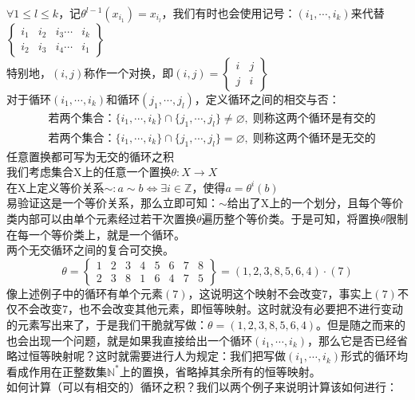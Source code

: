 $\forall 1\leq l\leq k$，记$\theta^{l-1}(x_{i_1})=x_{i_l}$，我们有时也会使用记号：$(i_1,\cdots,i_k)$来代替$
\left\{
\begin{array}{ccccc}
i_1&i_2&i_3\cdots &i_k\\
i_2&i_3&i_4\cdots &i_1
\end{array}
\right\}
$\\
特别地，$(i,j)$称作一个对换，即$(i,j)=
\left\{
\begin{array}{cc}
i&j\\
j&i
\end{array}
\right\}
$\\
对于循环$(i_1,\cdots,i_k)$和循环$(j_1,\cdots,j_l)$，定义循环之间的相交与否：
\[
\begin{aligned}
&\text{若两个集合：}\{i_1,\cdots,i_k\}\cap\{j_1,\cdots,j_l\}\neq \varnothing,\;\text{则称这两个循环是有交的}\\
&\text{若两个集合：}\{i_1,\cdots,i_k\}\cap\{j_1,\cdots,j_l\}= \varnothing,\;\text{则称这两个循环是无交的}
\end{aligned}
\]
任意置换都可写为无交的循环之积\\
我们考虑集合X上的任意一个置换$\theta \colon X\to X$\\
在X上定义等价关系$\sim\colon a\sim b\iff \exists i\in \mathbb{Z}$，使得$a=\theta^i(b)$\\
易验证这是一个等价关系，那么立即可知：$\sim$给出了X上的一个划分，且每个等价类内部可以由单个元素经过若干次置换$\theta$遍历整个等价类。于是可知，将置换$\theta$限制在每一个等价类上，就是一个循环。\\
两个无交循环之间的复合可交换。\\
\[
\theta=\left\{
\begin{array}{cccccccc}
1&2&3&4&5&6&7&8\\
2&3&8&1&6&4&7&5
\end{array}
\right\}
=(1,2,3,8,5,6,4)\cdot(7)
\]
像上述例子中的循环有单个元素$(7)$，这说明这个映射不会改变7，事实上$(7)$不仅不会改变7，也不会改变其他元素，即恒等映射。这时就没有必要把不进行变动的元素写出来了，于是我们干脆就写做：$\theta=(1,2,3,8,5,6,4)$。但是随之而来的也会出现一个问题，就是如果我直接给出一个循环$(i_1,\cdots,i_k)$，那么它是否已经省略过恒等映射呢？这时就需要进行人为规定：我们把写做$(i_1,\cdots,i_k)$形式的循环均看成作用在正整数集$\mathbb{N}^*$上的置换，省略掉其余所有的恒等映射。\\
如何计算（可以有相交的）循环之积？我们以两个例子来说明计算该如何进行：\\
